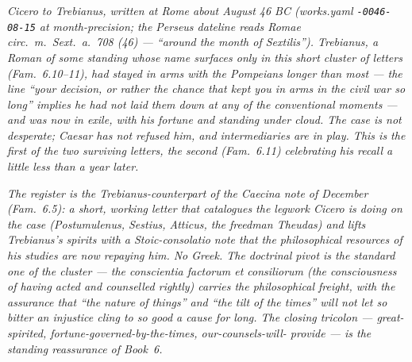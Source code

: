 
\textit{Cicero to Trebianus, written at Rome about August 46 BC
(works.yaml \texttt{-0046-08-15} at month-precision; the Perseus
dateline reads \textit{Romae circ.~m.~Sext.~a.~708 (46)} ---
``around the month of Sextilis''). Trebianus, a Roman of some
standing whose name surfaces only in this short cluster of letters
(\textit{Fam.}~6.10--11), had stayed in arms with the Pompeians
longer than most --- the line ``your decision, or rather the chance
that kept you in arms in the civil war so long'' implies he had not
laid them down at any of the conventional moments --- and was now
in exile, with his fortune and standing under cloud. The case is
not desperate; Caesar has not refused him, and intermediaries are
in play. This is the first of the two surviving letters, the
second (\textit{Fam.}~6.11) celebrating his recall a little less
than a year later.}

\textit{The register is the Trebianus-counterpart of the Caecina
note of December (\textit{Fam.}~6.5): a short, working letter that
catalogues the legwork Cicero is doing on the case (Postumulenus,
Sestius, Atticus, the freedman Theudas) and lifts Trebianus's
spirits with a Stoic-consolatio note that the philosophical
resources of his studies are now repaying him. No Greek. The
doctrinal pivot is the standard one of the cluster --- the
\textit{conscientia factorum et consiliorum} (the consciousness of
having acted and counselled rightly) carries the philosophical
freight, with the assurance that ``the nature of things'' and ``the
tilt of the times'' will not let so bitter an injustice cling to
so good a cause for long. The closing tricolon ---
great-spirited, fortune-governed-by-the-times, our-counsels-will-
provide --- is the standing reassurance of Book~6.}
